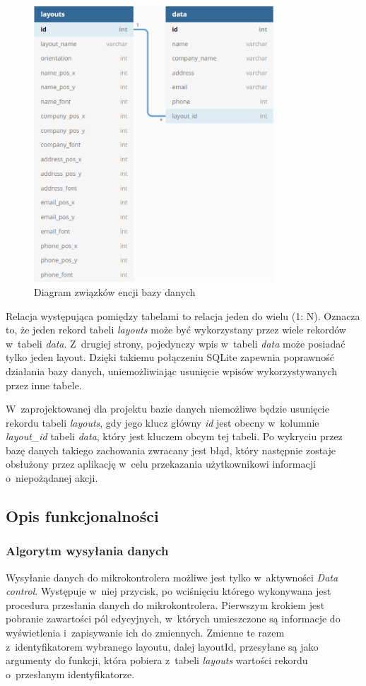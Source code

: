 \documentclass[a4paper,12pt, twoside]{article}
\begin{document}
        \begin{figure}[H]
    	        \centering
    			\includegraphics[width=9cm]{images/rys_11baza.png}
    			\caption{Diagram związków encji bazy danych}
                \label{fig:database}
    	\end{figure}
    	
        Relacja występująca pomiędzy tabelami to relacja jeden do wielu (1: N). Oznacza to, że jeden rekord tabeli \textit{layouts} może być wykorzystany przez wiele rekordów w~tabeli \textit{data}. Z~drugiej strony, pojedynczy wpis w~tabeli \textit{data} może posiadać tylko jeden layout. Dzięki takiemu połączeniu SQLite zapewnia poprawność działania bazy danych, uniemożliwiając usunięcie wpisów wykorzystywanych przez inne tabele. 
        
        W~zaprojektowanej dla projektu bazie danych niemożliwe będzie usunięcie rekordu tabeli \textit{layouts}, gdy jego klucz główny \textit{id} jest obecny w~kolumnie \textit{layout\_id} tabeli \textit{data}, który jest kluczem obcym tej tabeli. Po wykryciu przez bazę danych takiego zachowania zwracany jest błąd, który następnie zostaje obsłużony przez aplikację w~celu przekazania użytkownikowi informacji o~niepożądanej akcji.
        
        \subsection{Opis funkcjonalności}
    	
    	\subsubsection{Algorytm wysyłania danych}
    	Wysyłanie danych do mikrokontrolera możliwe jest tylko w~aktywności \textit{Data control}. Występuje w~niej przycisk, po wciśnięciu którego wykonywana jest procedura przesłania danych do mikrokontrolera. Pierwszym krokiem jest pobranie zawartości pól edycyjnych, w~których umieszczone są informacje do wyświetlenia i~zapisywanie ich do zmiennych. Zmienne te razem z~identyfikatorem wybranego layoutu, dalej layoutId, przesyłane są jako argumenty do funkcji, która pobiera z~tabeli \textit{layouts} wartości rekordu o~przesłanym identyfikatorze.
    	
\end{document}
